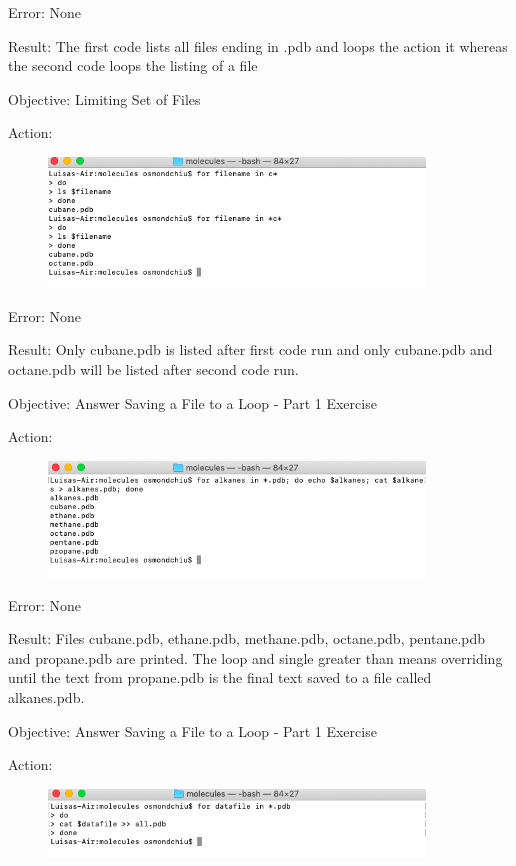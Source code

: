 \documentclass{article}
\begin{document}
Error: None

Result: The first code lists all files ending in .pdb and loops the action it whereas the second code loops the listing of a file

Objective: Limiting Set of Files 

Action:\par
\begin{figure}[htp]
    \centering
    \includegraphics[width=10cm]{Screenshot15.png}
    \label{fig:ls-15}
\end{figure}

Error: None

Result: Only cubane.pdb is listed after first code run and only cubane.pdb and octane.pdb will be listed after second code run.


Objective: Answer Saving a File to a Loop - Part 1 Exercise\par
Action:\par
\begin{figure}[htp]
    \centering
    \includegraphics[width=10cm]{Screenshot16.png}
    \label{fig:ls-16}
\end{figure}

Error: None

Result: Files  cubane.pdb, ethane.pdb, methane.pdb, octane.pdb, pentane.pdb and propane.pdb are printed. The loop and single greater than means overriding until the text from propane.pdb is the final text saved to a file called alkanes.pdb.

Objective: Answer Saving a File to a Loop - Part 1 Exercise\par
Action:\par
\begin{figure}[htp]
    \centering
    \includegraphics[width=10cm]{Screenshot17.png}
    \label{fig:ls-17}
\end{figure}
\end{document}
